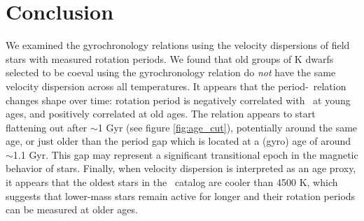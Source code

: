 \section{Conclusion}

We examined the gyrochronology relations using the velocity dispersions of
field stars with measured rotation periods.
We found that old groups of K dwarfs selected to be coeval using the
\citet{angus2019} gyrochronology relation do {\it not} have the same velocity
dispersion across all temperatures.
It appears that the period-\teff\ relation changes shape over time: rotation
period is negatively correlated with \teff\ at young ages, and positively
correlated at old ages.
The relation appears to start flattening out after $\sim$1 Gyr (see figure
\ref{fig:age_cut}), potentially around the same age, or just older than the
period gap which is located at a (gyro) age of around $\sim$1.1 Gyr.
This gap may represent a significant transitional epoch in the magnetic
behavior of stars.
Finally, when velocity dispersion is interpreted as an age proxy, it appears
that the oldest stars in the \mct\ catalog are cooler than 4500 K, which
suggests that lower-mass stars remain active for longer and their rotation
periods can be measured at older ages.
